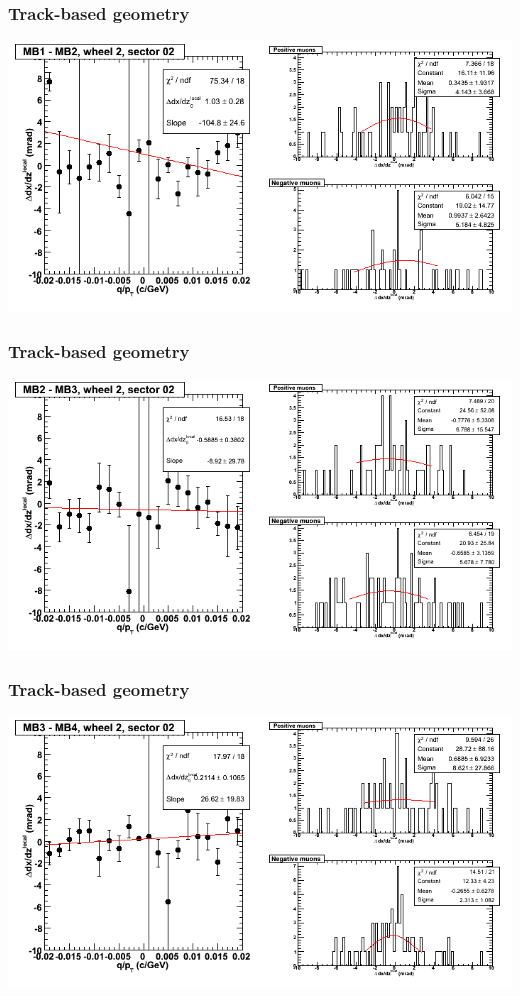 \documentclass[compress]{beamer}
\begin{document}
\begin{frame}
\frametitle{Track-based geometry}
\includegraphics[width=\linewidth]{NOV4_segdiffs/dt13_slope_E_02_12.png}
\end{frame}

\begin{frame}
\frametitle{Track-based geometry}
\includegraphics[width=\linewidth]{NOV4_segdiffs/dt13_slope_E_02_23.png}
\end{frame}

\begin{frame}
\frametitle{Track-based geometry}
\includegraphics[width=\linewidth]{NOV4_segdiffs/dt13_slope_E_02_34.png}
\end{frame}
\end{document}
